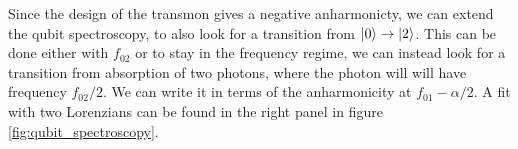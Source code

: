 Since the design of the transmon gives a negative anharmonicty, we can extend the qubit spectroscopy, to also look for a transition from $\ket{0}\to \ket{2}$. This can be done either with $f_{02}$ or to stay in the frequency regime, we can instead look for a transition from absorption of two photons, where the photon will will have frequency $f_{02} / 2$.  We can write it in terms of the anharmonicity at $f_{01} - \alpha / 2$. A fit with two Lorenzians can be found in the right panel in figure \ref{fig:qubit_spectroscopy}. 
